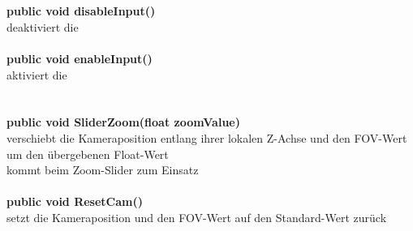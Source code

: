 \section{\srs}
%
\textbf{public void disableInput()}\\
deaktiviert die \srs\\
\\
\textbf{public void enableInput()}\\
aktiviert die \srs\\
%
\section{\zcs}
%
\textbf{public void SliderZoom(float zoomValue)}\\
verschiebt die Kameraposition entlang ihrer lokalen Z-Achse und den FOV-Wert um den übergebenen Float-Wert\\
kommt beim Zoom-Slider zum Einsatz\\
\\
\textbf{public void ResetCam()}\\
setzt die Kameraposition und den FOV-Wert auf den Standard-Wert zurück
%